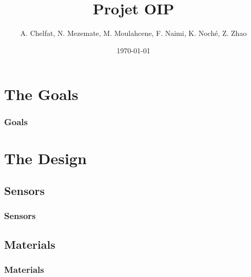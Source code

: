 \documentclass[12pt]{beamer}
\author{A. Chelfat, N. Mezemate, M. Moulahcene, F. Naimi, K. Noché, Z. Zhao}
\title{Projet OIP}
\institute{Sorbonne Université}
\date{\today}
\begin{document}

    \maketitle

    \section{The Goals}
        \begin{frame}
            \frametitle{Goals}
        \end{frame}

    \section{The Design}
        \subsection{Sensors} %
            \begin{frame}
                \frametitle{Sensors}
            \end{frame}
        \subsection{Materials}
            \begin{frame}
                \frametitle{Materials}
            \end{frame}
\end{document}

